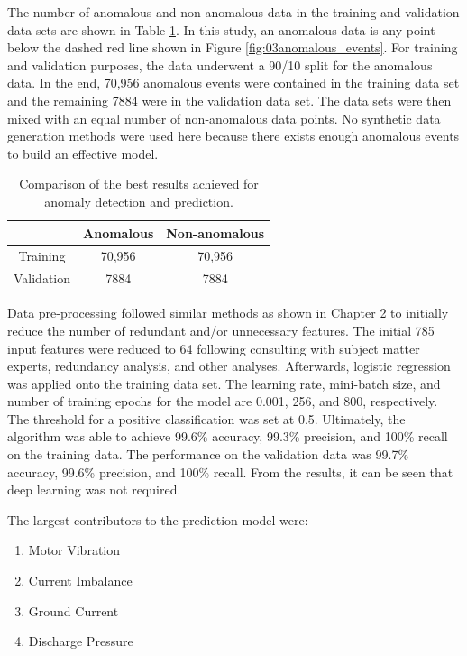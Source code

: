 The number of anomalous and non-anomalous data in the training and validation data sets are shown in Table \ref{tab:03train_validate}. In this study, an anomalous data is any point below the dashed red line shown in Figure \ref{fig:03anomalous_events}. For training and validation purposes, the data underwent a 90/10 split for the anomalous data.  In the end, 70,956 anomalous events were contained in the training data set and the remaining 7884 were in the validation data set. The data sets were then mixed with an equal number of non-anomalous data points.  No synthetic data generation methods were used here because there exists enough anomalous events to build an effective model.

\begin{table}[H]
    \centering
    \begin{tabular}{ c | c | c }
          & Anomalous & Non-anomalous  \\
        \hline
        Training & 70,956 & 70,956 \\
        Validation & 7884 & 7884 \\
    \end{tabular}
    \caption{Comparison of the best results achieved for anomaly detection and prediction.}
    \label{tab:03train_validate}
\end{table}

Data pre-processing followed similar methods as shown in Chapter 2 to initially reduce the number of redundant and/or unnecessary features.  The initial 785 input features were reduced to 64 following consulting with subject matter experts, redundancy analysis, and other analyses. Afterwards, logistic regression was applied onto the training data set.  The learning rate, mini-batch size, and number of training epochs for the model are 0.001, 256, and 800, respectively. The threshold for a positive classification was set at 0.5. Ultimately, the algorithm was able to achieve 99.6\% accuracy, 99.3\% precision, and 100\% recall on the training data.  The performance on the validation data was 99.7\% accuracy, 99.6\% precision, and 100\% recall.  From the results, it can be seen that deep learning was not required.

The largest contributors to the prediction model were:
\begin{enumerate}
    \item Motor Vibration
    \item Current Imbalance
    \item Ground Current
    \item Discharge Pressure
\end{enumerate}

